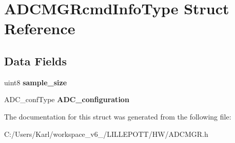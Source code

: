 \hypertarget{struct_a_d_c_m_g_rcmd_info_type}{}\section{A\+D\+C\+M\+G\+Rcmd\+Info\+Type Struct Reference}
\label{struct_a_d_c_m_g_rcmd_info_type}
\subsection*{Data Fields}
\begin{DoxyCompactItemize}
\item 
\mbox{\label{struct_a_d_c_m_g_rcmd_info_type_a18b5981baee94493a2bd06ff64a87918}} 
uint8 {\bfseries sample\+\_\+size}
\item 
\mbox{\label{struct_a_d_c_m_g_rcmd_info_type_a3f78b0ce54a6f57f456bf97022424d19}} 
A\+D\+C\+\_\+conf\+Type {\bfseries A\+D\+C\+\_\+configuration}
\end{DoxyCompactItemize}


The documentation for this struct was generated from the following file\+:\begin{DoxyCompactItemize}
\item 
C\+:/\+Users/\+Karl/workspace\+\_\+v6\+\_/\+L\+I\+L\+L\+E\+P\+O\+T\+T/\+H\+W/A\+D\+C\+M\+G\+R.\+h\end{DoxyCompactItemize}
